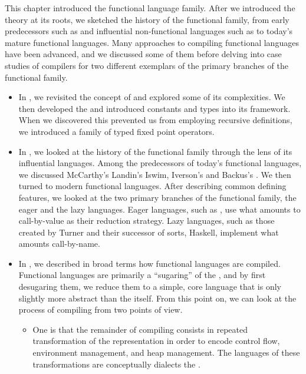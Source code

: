 \label{functional:conclusion}
This chapter introduced the functional language family. After we introduced the theory at its roots, we sketched the history of the functional family, from early predecessors such as  and influential non-functional languages such as  to today's mature functional languages. Many approaches to compiling functional languages have been advanced, and we discussed some of them before delving into case studies of compilers for two different exemplars of the primary branches of the functional family.

\begin{itemize}
\item In , we revisited the concept of  and explored some of its complexities. We then developed the \lambdacalc and introduced constants and types into its framework. When we discovered this prevented us from employing recursive definitions, we introduced a family of typed fixed point operators.

\item In , we looked at the history of the functional family through the lens of its influential languages. Among the predecessors of today's functional languages, we discussed McCarthy's  Landin's Iswim, Iverson's  and Backus's . We then turned to modern functional languages. After describing common defining features, we looked at the two primary branches of the functional family, the eager and the lazy languages. Eager languages, such as , use what amounts to call-by-value as their reduction strategy. Lazy languages, such as those created by Turner and their successor of sorts, Haskell, implement what amounts call-by-name.

\item In , we described in broad terms how functional languages are compiled. Functional languages are primarily a ``sugaring'' of the \lambdacalc{}, and by first desugaring them, we reduce them to a simple, core language that is only slightly more abstract than the \lambdacalc itself. From this point on, we can look at the process of compiling from two points of view.
\begin{itemize}
\item
One is that the remainder of compiling consists in repeated transformation of the representation in order to encode control flow, environment management, and heap management. The languages of these transformations are conceptually dialects the \lambdacalc{}.


\end{itemize}
\end{itemize}
